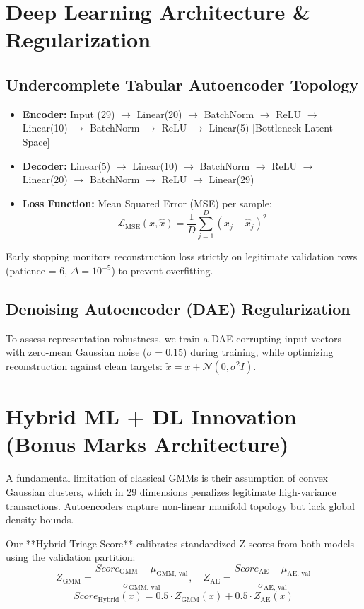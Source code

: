 \documentclass[conference]{IEEEtran}
\begin{document}
\section{Deep Learning Architecture \& Regularization}
\subsection{Undercomplete Tabular Autoencoder Topology}
\begin{itemize}
    \item \textbf{Encoder:} Input (29) $\to$ Linear(20) $\to$ BatchNorm $\to$ ReLU $\to$ Linear(10) $\to$ BatchNorm $\to$ ReLU $\to$ Linear(5) [Bottleneck Latent Space]
    \item \textbf{Decoder:} Linear(5) $\to$ Linear(10) $\to$ BatchNorm $\to$ ReLU $\to$ Linear(20) $\to$ BatchNorm $\to$ ReLU $\to$ Linear(29)
    \item \textbf{Loss Function:} Mean Squared Error (MSE) per sample:
    \begin{equation}
    \mathcal{L}_{\text{MSE}}(x, \hat{x}) = \frac{1}{D}\sum_{j=1}^D (x_j - \hat{x}_j)^2
    \end{equation}
\end{itemize}
Early stopping monitors reconstruction loss strictly on legitimate validation rows (patience = 6, $\Delta = 10^{-5}$) to prevent overfitting.

\subsection{Denoising Autoencoder (DAE) Regularization}
To assess representation robustness, we train a DAE corrupting input vectors with zero-mean Gaussian noise ($\sigma = 0.15$) during training, while optimizing reconstruction against clean targets: $\tilde{x} = x + \mathcal{N}(0, \sigma^2 I)$.

\section{Hybrid ML + DL Innovation (Bonus Marks Architecture)}
A fundamental limitation of classical GMMs is their assumption of convex Gaussian clusters, which in 29 dimensions penalizes legitimate high-variance transactions. Autoencoders capture non-linear manifold topology but lack global density bounds. 

Our **Hybrid Triage Score** calibrates standardized Z-scores from both models using the validation partition:
\begin{equation}
Z_{\text{GMM}} = \frac{Score_{\text{GMM}} - \mu_{\text{GMM, val}}}{\sigma_{\text{GMM, val}}}, \quad Z_{\text{AE}} = \frac{Score_{\text{AE}} - \mu_{\text{AE, val}}}{\sigma_{\text{AE, val}}}
\end{equation}
\begin{equation}
Score_{\text{Hybrid}}(x) = 0.5 \cdot Z_{\text{GMM}}(x) + 0.5 \cdot Z_{\text{AE}}(x)
\end{equation}
\end{document}
